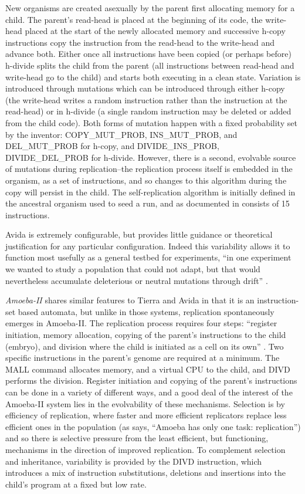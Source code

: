 New organisms are created asexually by the parent first allocating memory for a child. The parent's read-head is placed at the beginning of its code, the write-head placed at the start of the newly allocated memory and successive h-copy instructions copy the instruction from the read-head to the write-head and advance both. Either once all instructions have been copied (or perhaps before) h-divide splits the child from the parent (all instructions between read-head and write-head go to the child) and starts both executing in a clean state. Variation is introduced through mutations which can be introduced through either h-copy (the write-head writes a random instruction rather than the instruction at the read-head) or in h-divide (a single random instruction may be deleted or added from the child code). Both forms of mutation happen with a fixed probability set by the inventor: COPY\_MUT\_PROB, INS\_MUT\_PROB, and DEL\_MUT\_PROB for h-copy, and DIVIDE\_INS\_PROB, DIVIDE\_DEL\_PROB for h-divide. However, there is a second, evolvable source of mutations during replication--the replication process itself is embedded in the organism, as a set of instructions, and so changes to this algorithm during the copy will persist in the child. The self-replication algorithm is initially defined in the ancestral organism used to seed a run, and as documented in \cite[A1.3]{Ofria2004} consists of 15 instructions.

Avida is extremely configurable, but provides little guidance or theoretical justification for any particular configuration. Indeed this variability allows it to function most usefully as a general testbed for experiments, \eg ``in one experiment we wanted to study a population that could not adapt, but that would nevertheless accumulate deleterious or neutral mutations through drift'' \parencite{Ofria2004}.

\emph{Amoeba-II} \parencite{Pargellis2001} shares similar features to Tierra and Avida in that it is an instruction-set based automata, but unlike in those systems, replication spontaneously emerges in Amoeba-II. The replication process requires four steps: ``register initiation, memory allocation, copying of the parent's instructions to the child (embryo), and division where the child is initiated as a cell on its own'' \parencite[p.69]{Pargellis2001}. Two specific instructions in the parent's genome are required at a minimum. The MALL command allocates memory, and a virtual CPU to the child, and DIVD performs the division. Register initiation and copying of the parent's instructions can be done in a variety of different ways, and a good deal of the interest of the Amoeba-II system lies in the evolvability of these mechanisms. Selection is by efficiency of replication, where faster and more efficient replicators replace less efficient ones in the population (as \cite{Pargellis2001} says, ``Amoeba has only one task: replication'') and so there is selective pressure from the least efficient, but functioning, mechanisms in the direction of improved replication. To complement selection and inheritance, variability is provided by the DIVD instruction, which introduces a mix of instruction substitutions, deletions and insertions into the child's program at a fixed but low rate.

